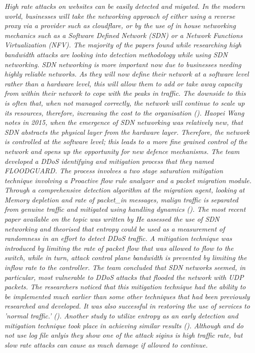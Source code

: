 \textit{High rate attacks on websites can be easily detected and migated.  In the modern world, businesses will take the networking approach of either using a reverse proxy via a provider such as cloudflare, or by the use of in house networking mechanics such as a Software Defined Network (SDN) or a Network Functions Virtualization (NFV). The majority of the papers found while researching high bandwidth attacks are looking into detection methodology while using SDN networking. SDN networking is more important now due to businesses needing highly reliable networks.  As they will now define their network at a software level rather than a hardware level, this will allow them to add or take away capacity from within their network to cope with the peaks in traffic. The downside to this is often that, when not managed correctly, the network will continue to scale up its resources, therefore, increasing the cost to the organisation (\cite{Techbeacon}). 
Haopei Wang notes in 2015, when the emergence of SDN networking was relatively new, that SDN abstracts the physical layer from the hardware layer. Therefore, the network is controlled at the software level; this leads to a more fine grained control of the network and opens up the opportunity for new defence mechanisms. The team developed a DDoS identifying and mitigation process that they named FLOODGUARD. The process involves a two stage saturation mitigation technique involving a Proactive flow rule analyzer and a packet migration module. Through a comprehensive detection algorithm at the migration agent, looking at Memory depletion and rate of packet\_in messages, malign traffic is separated from genuine traffic and mitigated using handling dynamics (\cite{7266854}).
The most recent paper available on the topic was written by \citeauthor{ahalawat2019entropy} He assessed the use of SDN networking and theorised that entropy could be used as a measurement of randomness in an effort to detect DDoS traffic. A mitigation technique was introduced by limiting the rate of packet flow that was allowed to flow to the switch, while in turn, attack control plane bandwidth is prevented by limiting the inflow rate to the controller.  The team concluded that SDN networks seemed, in particular, most vulnerable to DDoS attacks that flooded the network with UDP packets. The researchers noticed that this mitigation technique had the ability to be implemented much earlier than some other techniques that had been previously researched and developed. It was also successful in restoring the use of services to 'normal traffic.' (\cite{ahalawat2019entropy}). Another study to utilize entropy as an early detection and mitigation technique took place in \citeyear{kumar2018safety} achieving similar results (\cite{kumar2018safety}). Although \citeauthor{ahalawat2019entropy} and \citeauthor{kumar2018safety} do not use log file anlyis they show one of the  attack sigins is high traffic rate, but slow rate attacks can cause as much damage if allowed to continue.
}
